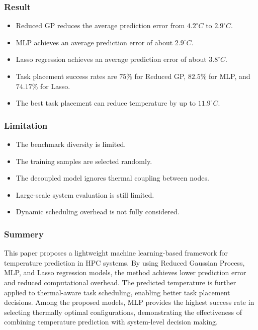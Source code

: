 \documentclass[12pt,a4paper]{article}
\begin{document}
    \subsubsection{Result}

                \begin{itemize}
                    \item Reduced GP reduces the average prediction error from $4.2^\circ C$ to $2.9^\circ C$.
                    \item MLP achieves an average prediction error of about $2.9^\circ C$.
                    \item Lasso regression achieves an average prediction error of about $3.8^\circ C$.
                    \item Task placement success rates are $75\%$ for Reduced GP, $82.5\%$ for MLP, and $74.17\%$ for Lasso.
                    \item The best task placement can reduce temperature by up to $11.9^\circ C$.
                \end{itemize}

    \subsubsection{Limitation}

                \begin{itemize}
                    \item The benchmark diversity is limited.
                    \item The training samples are selected randomly.
                    \item The decoupled model ignores thermal coupling between nodes.
                    \item Large-scale system evaluation is still limited.
                    \item Dynamic scheduling overhead is not fully considered.
                \end{itemize} 
                
    \subsubsection{Summery}
                    This paper proposes a lightweight machine learning-based framework for temperature prediction in HPC systems. By using Reduced Gaussian Process, MLP, and Lasso regression models, the method achieves lower prediction error and reduced computational overhead. The predicted temperature is further applied to thermal-aware task scheduling, enabling better task placement decisions. Among the proposed models, MLP provides the highest success rate in selecting thermally optimal configurations, demonstrating the effectiveness of combining temperature prediction with system-level decision making.
\end{document}
